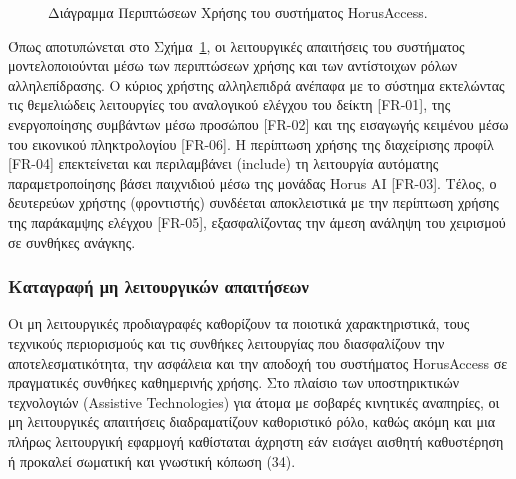 \documentclass[twoside, a4paper, 11pt]{article}
\newcommand{\textlatin}[1]{\textenglish{#1}}
\begin{document}
\begin{figure}[!htbp]
\caption{Διάγραμμα Περιπτώσεων Χρήσης του συστήματος HorusAccess.}
\label{fig:use_case_diagram}
\end{figure}


Όπως αποτυπώνεται στο Σχήμα~\ref{fig:use_case_diagram}, οι λειτουργικές απαιτήσεις του συστήματος μοντελοποιούνται μέσω των περιπτώσεων χρήσης και των αντίστοιχων ρόλων αλληλεπίδρασης. Ο κύριος χρήστης αλληλεπιδρά ανέπαφα με το σύστημα εκτελώντας τις θεμελιώδεις λειτουργίες του αναλογικού ελέγχου του δείκτη [FR-01], της ενεργοποίησης συμβάντων μέσω προσώπου [FR-02] και της εισαγωγής κειμένου μέσω του εικονικού πληκτρολογίου [FR-06]. Η περίπτωση χρήσης της διαχείρισης προφίλ [FR-04] επεκτείνεται και περιλαμβάνει (\textlatin{\guillemotleft include\guillemotright}) τη λειτουργία αυτόματης παραμετροποίησης βάσει παιχνιδιού μέσω της μονάδας \textlatin{Horus AI} [FR-03]. Τέλος, ο δευτερεύων χρήστης (φροντιστής) συνδέεται αποκλειστικά με την περίπτωση χρήσης της παράκαμψης ελέγχου [FR-05], εξασφαλίζοντας την άμεση ανάληψη του χειρισμού σε συνθήκες ανάγκης.

\subsubsection{Καταγραφή μη λειτουργικών απαιτήσεων}
Οι μη λειτουργικές προδιαγραφές καθορίζουν τα ποιοτικά χαρακτηριστικά, τους τεχνικούς περιορισμούς και τις συνθήκες λειτουργίας που διασφαλίζουν την αποτελεσματικότητα, την ασφάλεια και την αποδοχή του συστήματος \textlatin{HorusAccess} 
σε πραγματικές συνθήκες καθημερινής χρήσης. Στο πλαίσιο των υποστηρικτικών τεχνολογιών (\textlatin{Assistive Technologies}) για άτομα με σοβαρές κινητικές αναπηρίες, οι μη λειτουργικές απαιτήσεις διαδραματίζουν καθοριστικό ρόλο, καθώς ακόμη και μια πλήρως λειτουργική εφαρμογή καθίσταται
 άχρηστη εάν εισάγει αισθητή καθυστέρηση ή προκαλεί σωματική και γνωστική κόπωση (34).
\end{document}
